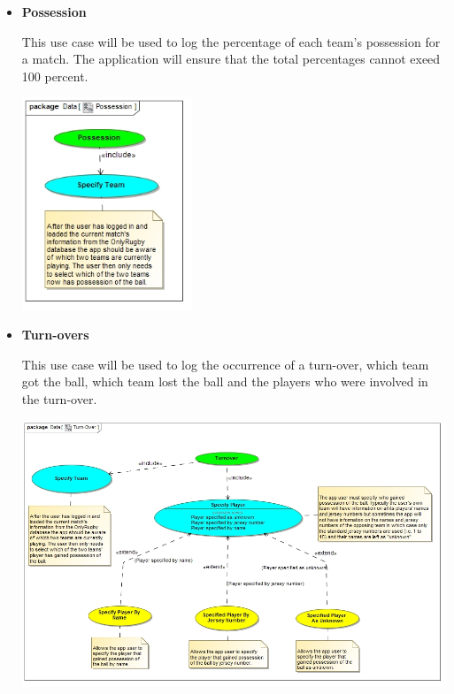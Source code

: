 \documentclass[a4paper,12pt]{report}
\begin{document}
\begin{itemize}
\begin{center}
		\end{center}
	\item \textbf{Possession}
		\begin{flushleft}
		This use case will be used to log the percentage of each team's possession for a match. The application will ensure that the total percentages cannot exeed 100 percent.
		\end{flushleft}
		\begin{center}
		\includegraphics[width=0.4\textwidth]{./Diagrams/Possession.jpg}\\[0.4cm]
		\end{center}
	\item \textbf{Turn-overs}
		\begin{flushleft}
		This use case will be used to log the occurrence of a turn-over, which team got the ball, which team lost the ball and the players who were involved in the turn-over.
		\end{flushleft}
		\begin{center}
		\includegraphics[width=1\textwidth]{./Diagrams/Turn-Over.jpg}\\[0.4cm]

\end{center}
\end{itemize}
\end{document}
